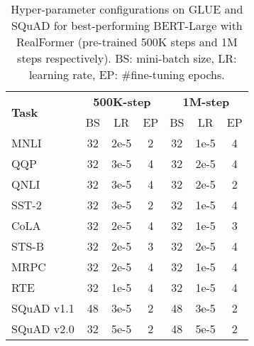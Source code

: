 \documentclass[11pt,a4paper]{article}
\begin{document}
\begin{table}[t]
\setlength{\tabcolsep}{5pt}
\centering
\begin{tabular}{l|ccc|ccc}
\hline 
\multirow{2}{*}{\textbf{Task}}  &\multicolumn{3}{c|}{\textbf{500K-step}}     &\multicolumn{3}{c}{\textbf{1M-step}} \\
                                &BS   &LR      &EP                           &BS   & LR       &EP   \\ \hline
MNLI                            &32   &2e-5    &2                            &32   &1e-5      &4   \\  QQP                             &32   &3e-5    &4                            &32   &2e-5      &4   \\  QNLI                            &32   &3e-5    &4                            &32   &2e-5      &2   \\  SST-2                           &32   &3e-5    &2                            &32   &1e-5      &4   \\  CoLA                            &32   &2e-5    &4                            &32   &1e-5      &3   \\  STS-B                           &32   &2e-5    &3                            &32   &2e-5      &4   \\  MRPC                            &32   &2e-5    &4                            &32   &1e-5      &4   \\  RTE                             &32   &1e-5    &4                            &32   &1e-5      &4   \\  \hline  SQuAD v1.1                      &48   &3e-5    &2                            &48   &3e-5      &2   \\
SQuAD v2.0                      &32   &5e-5    &2                            &48   &5e-5      &2   \\ \hline
\end{tabular}
\caption{Hyper-parameter configurations on GLUE and SQuAD for best-performing BERT-Large with RealFormer (pre-trained 500K steps and 1M steps respectively). BS: mini-batch size, LR: learning rate, EP: \#fine-tuning epochs.}
\label{table:bert-hyperpara}
\end{table}
\end{document}
